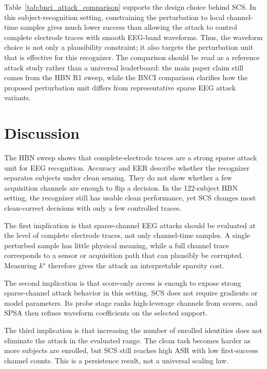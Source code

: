 \documentclass[journal]{IEEEtran}
\begin{document}
Table~\ref{tab:bnci_attack_comparison} supports the design choice behind SCS. In this subject-recognition setting, constraining the perturbation to local channel-time samples gives much lower success than allowing the attack to control complete electrode traces with smooth EEG-band waveforms. Thus, the waveform choice is not only a plausibility constraint; it also targets the perturbation unit that is effective for this recognizer. The comparison should be read as a reference attack study rather than a universal leaderboard: the main paper claim still comes from the HBN R1 sweep, while the BNCI comparison clarifies how the proposed perturbation unit differs from representative sparse EEG attack variants.

\section{Discussion}

The HBN sweep shows that complete-electrode traces are a strong sparse attack unit for EEG recognition. Accuracy and EER describe whether the recognizer separates subjects under clean sensing. They do not show whether a few acquisition channels are enough to flip a decision. In the 122-subject HBN setting, the recognizer still has usable clean performance, yet SCS changes most clean-correct decisions with only a few controlled traces.

The first implication is that sparse-channel EEG attacks should be evaluated at the level of complete electrode traces, not only channel-time samples. A single perturbed sample has little physical meaning, while a full channel trace corresponds to a sensor or acquisition path that can plausibly be corrupted. Measuring $k^\star$ therefore gives the attack an interpretable sparsity cost.

The second implication is that score-only access is enough to expose strong sparse-channel attack behavior in this setting. SCS does not require gradients or model parameters. Its probe stage ranks high-leverage channels from scores, and SPSA then refines waveform coefficients on the selected support.

The third implication is that increasing the number of enrolled identities does not eliminate the attack in the evaluated range. The clean task becomes harder as more subjects are enrolled, but SCS still reaches high ASR with low first-success channel counts. This is a persistence result, not a universal scaling law.
\end{document}
